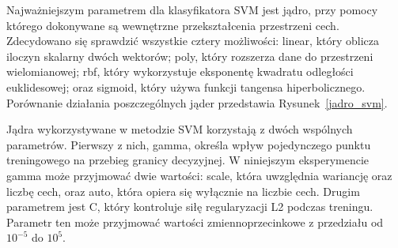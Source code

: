 \documentclass[a4paper,twoside,12pt]{book}
\begin{document}
Najważniejszym parametrem dla klasyfikatora SVM jest jądro, przy pomocy którego dokonywane są wewnętrzne przekształcenia przestrzeni cech. Zdecydowano się sprawdzić wszystkie cztery możliwości: linear, który oblicza iloczyn skalarny dwóch wektorów; poly, który rozszerza dane do przestrzeni wielomianowej; rbf, który wykorzystuje eksponentę kwadratu odległości euklidesowej; oraz sigmoid, który używa funkcji tangensa hiperbolicznego. Porównanie działania poszczególnych jąder przedstawia Rysunek~\ref{jadro_svm}.

Jądra wykorzystywane w metodzie SVM korzystają z dwóch wspólnych parametrów. Pierwszy z nich, gamma, określa wpływ pojedynczego punktu treningowego na przebieg granicy decyzyjnej. W niniejszym eksperymencie gamma może przyjmować dwie wartości: scale, która uwzględnia wariancję oraz liczbę cech, oraz auto, która opiera się wyłącznie na liczbie cech. Drugim parametrem jest C, który kontroluje siłę regularyzacji L2 podczas treningu. Parametr ten może przyjmować wartości zmiennoprzecinkowe z przedziału od $10^{-5}$ do $10^{5}$.
\end{document}
